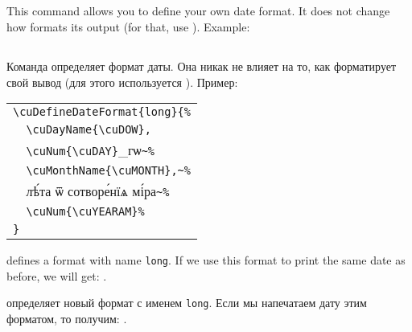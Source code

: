 \begin{EN}
\subsection{}
This command allows you to define your own date format.
It does not change how  formats its output (for that, use ).
Example:
\end{EN}

\begin{RU}
\subsection{}
Команда определяет формат даты. Она никак не влияет на то, как  форматирует свой вывод (для этого используется ).
Пример:
\end{RU}

\begin{center}
\begin{churchslavonic}
\begin{tabular}{l}
\verb+\cuDefineDateFormat{long}{%+\\
\verb+  \cuDayName{\cuDOW},+\\
\verb+  \cuNum{\cuDAY}+_гѡ\verb+~%+\\
\verb+  \cuMonthName{\cuMONTH},~%+\\
\verb+  +лѣ́та ѿ сотворе́нїѧ мі́ра\verb+~%+\\
\verb+  \cuNum{\cuYEARAM}%+\\
\verb+}+\\
\end{tabular}
\end{churchslavonic}
\end{center}
%
\begin{EN}
defines a format with name \texttt{long}. If we use this format to print the same date as before, we will get:
.
\end{EN}
%
\begin{RU}
определяет новый формат с именем \texttt{long}. Если мы напечатаем дату этим форматом, то получим:
.
\end{RU}

